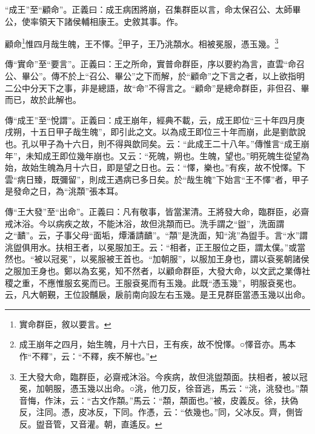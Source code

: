 {\noindent\shu{}\fzkt “成王”至“顧命”。正義曰：成王病困將崩，召集群臣以言，命太保召公、太師畢公，使率領天下諸侯輔相康王。史敘其事。作。 \par}

顧命\footnote{實命群臣，敘以要言。}惟四月哉生魄，王不懌。\footnote{成王崩年之四月，始生魄，月十六日，王有疾，故不悅懌。○懌音亦。馬本作“不釋”，云：“不釋，疾不解也。”}甲子，王乃洮頮水。相被冕服，憑玉幾。\footnote{王大發大命，臨群臣，必齋戒沐浴。今疾病，故但洮盥頮面。扶相者，被以冠冕，加朝服，憑玉幾以出命。○洮，他刀反，徐音逃，馬云：“洮，洮發也。”頮音悔，作沬，云：“古文作頮。”馬云：“頮，頮面也。”被，皮義反。徐，扶偽反，注同。憑，皮冰反，下同。作憑，云：“依幾也。”同，父冰反。齊，側皆反。盥音管，又音灌。朝，直遙反。}



{\noindent\zhuan{}\fzbyks 傳“實命”至“要言”。正義曰：王之所命，實普命群臣，序以要約為言，直雲“命召公、畢公”。傳不於上“召公、畢公”之下而解，於“顧命”之下言之者，以上欲指明二公中分天下之事，非是總語，故“命”不得言之。“顧命”是總命群臣，非但召、畢而已，故於此解也。 \par}

{\noindent\zhuan{}\fzbyks 傳“成王”至“悅謂”。正義曰：成王崩年，經典不載，云，成王即位“三十年四月庚戌朔，十五日甲子哉生魄”，即引此之文。以為成王即位三十年而崩，此是劉歆說也。孔以甲子為十六日，則不得與歆同矣。云：“此成王二十八年。”傳惟言“成王崩年”，未知成王即位幾年崩也。又云：“死魄，朔也。生魄，望也。”明死魄生從望為始，故始生魄為月十六日，即是望之日也。云：“懌，樂也。”有疾，故不悅懌。下雲“病日臻，既彌留”，則成王遇病已多日矣。於“哉生魄”下始言“王不懌”者，甲子是發命之日，為“洮頮”張本耳。 \par}

{\noindent\zhuan{}\fzbyks 傳“王大發”至“出命”。正義曰：凡有敬事，皆當潔清。王將發大命，臨群臣，必齋戒沐浴。今以病疾之故，不能沐浴，故但洮頮而已。洗手謂之“盥”，洗面謂之“靧”。云，子事父母“面垢，燂潘請靧”。“頮”是洗面，知“洮”為盥手。言“水”謂洮盥俱用水。扶相王者，以冕服加王。云：“相者，正王服位之臣，謂太僕。”或當然也。“被以冠冕”，以冕服被王首也。“加朝服”，以服加王身也，謂以袞冕朝諸侯之服加王身也。鄭以為玄冕，知不然者，以顧命群臣，大發大命，以文武之業傳社稷之重，不應惟服玄冕而已。王服袞冕而有玉幾。此既“憑玉幾”，明服袞冕也。云，凡大朝覲，王位設黼扆，扆前南向設左右玉幾。是王見群臣當憑玉幾以出命。 \par}

